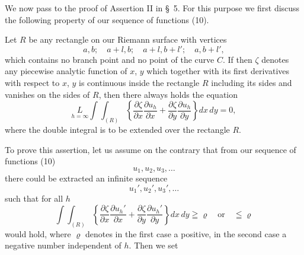 \documentclass{article}
\begin{document}
We now pass to the proof of Assertion II in §~5. For this purpose we first discuss the following property of our sequence of functions (10).

Let $R$ be any rectangle on our Riemann surface with vertices
\[
a, b; \quad a+l, b; \quad a+l, b+l'; \quad a, b+l',
\]
which contains no branch point and no point of the curve $C$. If then $\zeta$ denotes any piecewise analytic function of $x$, $y$ which together with its first derivatives with respect to $x$, $y$ is continuous inside the rectangle $R$ including its sides and vanishes on the sides of $R$, then there always holds the equation
\[
\underset{h=\infty}{L} \int\!\!\int_{(R)} \left\{ \frac{\partial\zeta}{\partial x} \frac{\partial u_h}{\partial x} + \frac{\partial\zeta}{\partial y} \frac{\partial u_h}{\partial y} \right\} dx\,dy = 0, \tag{11}
\]
where the double integral is to be extended over the rectangle $R$.

To prove this assertion, let us assume on the contrary that from our sequence of functions (10)
\[
u_1, u_2, u_3, \dots
\]
there could be extracted an infinite sequence
\[
u_1', u_2', u_3', \dots
\]
such that for all $h$
\[
\int\!\!\int_{(R)} \left\{ \frac{\partial\zeta}{\partial x} \frac{\partial u_h'}{\partial x} + \frac{\partial\zeta}{\partial y} \frac{\partial u_h'}{\partial y} \right\} dx\,dy \geqq \varrho \quad \text{or} \quad \leqq \varrho
\]
would hold, where $\varrho$ denotes in the first case a positive, in the second case a negative number independent of $h$. Then we set
\end{document}
